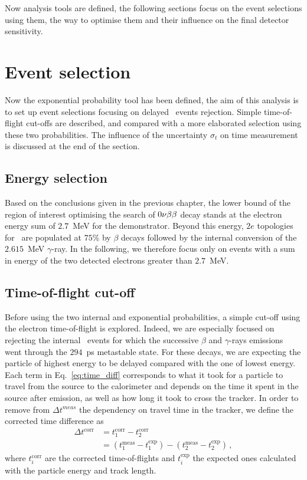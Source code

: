 Now analysis tools are defined, the following sections focus on the event selections using them, the way to optimise them and their influence on the final detector sensitivity.

\section{Event selection}
\label{sec:ev_selection}


Now the exponential probability tool has been defined, the aim of this analysis is to set up event selections focusing on delayed \Tl\ events rejection.
Simple time-of-flight cut-offs are described, and compared with a more elaborated selection using these two probabilities.
The influence of the uncertainty $\sigma_{t}$ on time measurement is discussed at the end of the section.

\subsection{Energy selection}
\label{subsec:energy_seletion}

Based on the conclusions given in the previous chapter, the lower bound of the region of interest optimising the search of $0\nu\beta\beta$ decay stands at the electron energy sum of $2.7$~MeV for the demonstrator.
Beyond this energy, $2e$ topologies for \Tl\ are populated at $75$\% by $\beta$ decays followed by the internal conversion of the $2.615$~MeV $\gamma$-ray.
In the following, we therefore focus only on events with a sum in energy of the two detected electrons greater than $2.7$~MeV.

\subsection{Time-of-flight cut-off}
\label{subsec:tof_cutoff}

Before using the two internal and exponential probabilities, a simple cut-off using the electron time-of-flight is explored.
Indeed, we are especially focused on rejecting the internal \Tl\ events for which the successive $\beta$ and $\gamma$-rays emissions went through the $294$~ps metastable state.
For these decays, we are expecting the particle of highest energy to be delayed compared with the one of lowest energy.
Each term in Eq.~\ref{eq:time_diff} corresponds to what it took for a particle to travel from the source to the calorimeter and depends on the time it spent in the source after emission, as well as how long it took to cross the tracker.
In order to remove from $\Delta t^{meas}$ the dependency on travel time in the tracker, we define the corrected time difference as
\begin{align}
  \Delta t^{\text{corr}} & = t^{\text{corr}}_{1} - t^{\text{corr}}_{2}\\
  & = (t^{\text{meas}}_{1} - t^{\text{exp}}_{1}) - (t^{\text{meas}}_{2} - t^{\text{exp}}_{2})\,,
\end{align}
where $t^{\text{corr}}_{i}$ are the corrected time-of-flights and $t^{\text{exp}}_{i}$ the expected ones calculated with the particle energy and track length.

